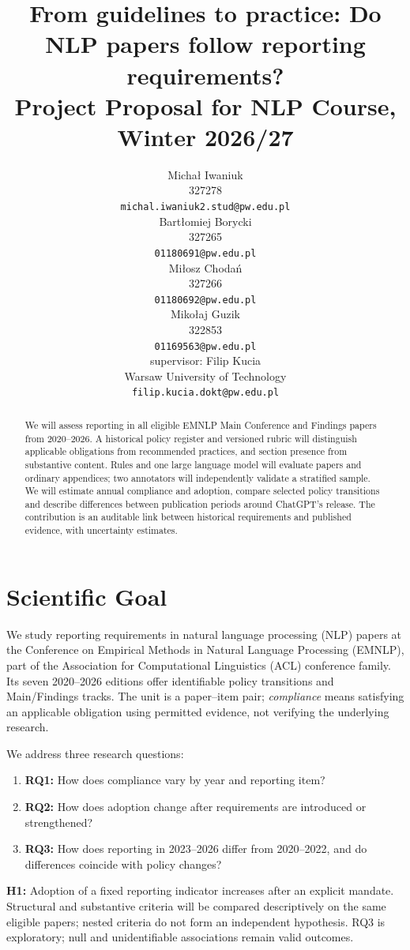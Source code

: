 \documentclass[11pt]{article}
\title{From guidelines to practice: Do NLP papers follow reporting requirements?\\
Project Proposal for NLP Course, Winter 2026/27}
\author{Michał Iwaniuk \\
  327278 \\
  {\tt michal.iwaniuk2.stud@pw.edu.pl} \\\And
  Bartłomiej Borycki \\
  327265 \\
  {\tt 01180691@pw.edu.pl} \\ \AND
  Miłosz Chodań \\
  327266 \\
  {\tt 01180692@pw.edu.pl} \\\And
  Mikołaj Guzik \\
  322853 \\
  {\tt 01169563@pw.edu.pl} \\ \AND
  supervisor: Filip Kucia\\
  Warsaw University of Technology \\
  {\tt filip.kucia.dokt@pw.edu.pl}}
\date{}
\begin{document}
\maketitle

\begin{abstract}
We will assess reporting in all eligible EMNLP Main Conference and Findings papers from 2020--2026. A historical policy register and versioned rubric will distinguish applicable obligations from recommended practices, and section presence from substantive content. Rules and one large language model will evaluate papers and ordinary appendices; two annotators will independently validate a stratified sample. We will estimate annual compliance and adoption, compare selected policy transitions and describe differences between publication periods around ChatGPT's release. The contribution is an auditable link between historical requirements and published evidence, with uncertainty estimates.
\end{abstract}

\section{Scientific Goal}
\label{sec:goal}
We study reporting requirements in natural language processing (NLP) papers at the Conference on Empirical Methods in Natural Language Processing (EMNLP), part of the Association for Computational Linguistics (ACL) conference family. Its seven 2020--2026 editions offer identifiable policy transitions and Main/Findings tracks. The unit is a paper--item pair; \emph{compliance} means satisfying an applicable obligation using permitted evidence, not verifying the underlying research.

We address three research questions:
\begin{enumerate}
\item \textbf{RQ1:} How does compliance vary by year and reporting item?
\item \textbf{RQ2:} How does adoption change after requirements are introduced or strengthened?
\item \textbf{RQ3:} How does reporting in 2023--2026 differ from 2020--2022, and do differences coincide with policy changes?
\end{enumerate}

\textbf{H1:} Adoption of a fixed reporting indicator increases after an explicit mandate. Structural and substantive criteria will be compared descriptively on the same eligible papers; nested criteria do not form an independent hypothesis. RQ3 is exploratory; null and unidentifiable associations remain valid outcomes.
\end{document}
